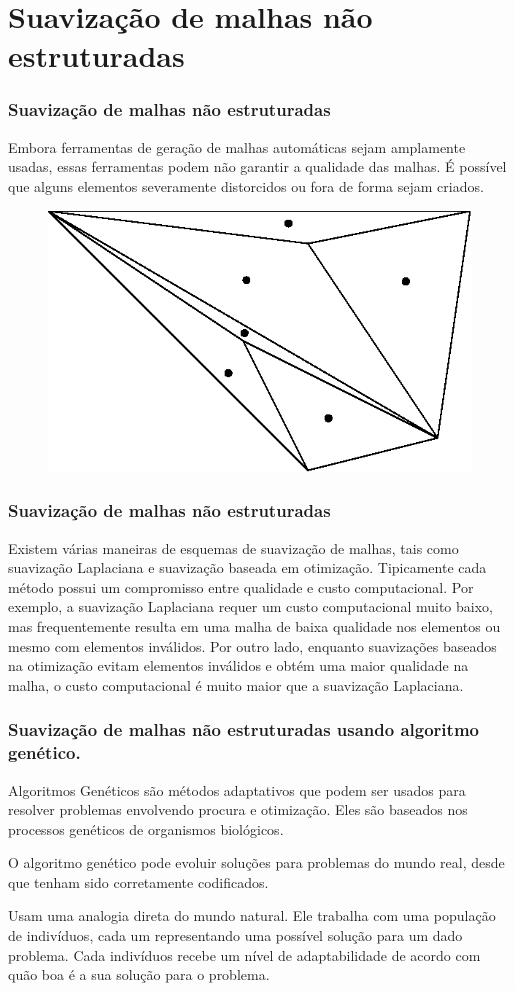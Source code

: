 \documentclass{beamer}
\begin{document}
\section{Suavização de malhas não estruturadas}
\begin{frame}
  \frametitle{Suavização de malhas não estruturadas}
  Embora ferramentas de geração de malhas automáticas sejam amplamente usadas, essas ferramentas podem não garantir a qualidade das malhas. É possível que alguns elementos severamente distorcidos ou fora de forma sejam criados.

  \begin{figure}
    \includegraphics[width=0.4\linewidth]{variacao_brusca.eps}
  \end{figure}
\end{frame}

\begin{frame}
  \frametitle{Suavização de malhas não estruturadas}

  Existem várias maneiras de esquemas de suavização de malhas, tais como suavização Laplaciana e suavização baseada em otimização. Tipicamente cada método possui um compromisso entre qualidade e custo computacional. Por exemplo, a suavização Laplaciana requer um custo computacional muito baixo, mas frequentemente resulta em uma malha de baixa qualidade nos elementos ou mesmo com elementos inválidos. Por outro lado, enquanto suavizações baseados na otimização evitam elementos inválidos e obtém uma maior qualidade na malha, o custo computacional é muito maior que a suavização Laplaciana.

\end{frame}

\begin{frame}
  \frametitle{Suavização de malhas não estruturadas usando algoritmo genético.}

  Algoritmos Genéticos são métodos adaptativos que podem ser usados para resolver problemas envolvendo procura e otimização. Eles são baseados nos processos genéticos de organismos biológicos.

  O algoritmo genético pode evoluir soluções para problemas do mundo real, desde que tenham sido corretamente codificados.

  Usam uma analogia direta do mundo natural. Ele trabalha com uma população de indivíduos, cada um representando uma possível solução para um dado problema. Cada indivíduos recebe um nível de adaptabilidade de acordo com quão boa é a sua solução para o problema.

\end{frame}
\end{document}
